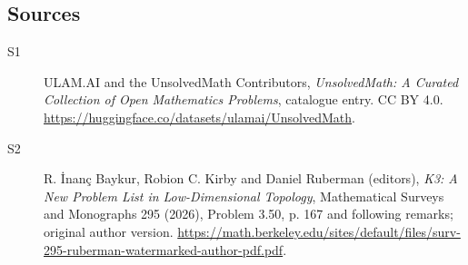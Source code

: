 \documentclass[11pt]{article}
\begin{document}
\subsection{Sources}
\begin{description}
\item[\hypertarget{source:statement:1}{S1}] ULAM.AI and the UnsolvedMath Contributors, \emph{UnsolvedMath: A Curated Collection of Open Mathematics Problems}, catalogue entry. CC BY 4.0. \url{https://huggingface.co/datasets/ulamai/UnsolvedMath}.
\item[\hypertarget{source:statement:2}{S2}] R. İnanç Baykur, Robion C. Kirby and Daniel Ruberman (editors), \emph{K3: A New Problem List in Low-Dimensional Topology}, Mathematical Surveys and Monographs 295 (2026), Problem 3.50, p. 167 and following remarks; original author version. \url{https://math.berkeley.edu/sites/default/files/surv-295-ruberman-watermarked-author-pdf.pdf}.
\end{description}
\label{end:statement}
\end{document}
